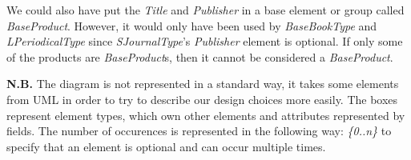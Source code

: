 We could also have put the \emph{Title} and \emph{Publisher} in a base element
or group called \emph{BaseProduct}. However, it would only have been used by
\emph{BaseBookType} and \emph{LPeriodicalType} since \emph{SJournalType}'s
\emph{Publisher} element is optional. If only some of the products are
\emph{BaseProduct}s, then it cannot be considered a \emph{BaseProduct}.

\begin{framehint}
\textbf{N.B.} The diagram is not represented in a standard way, it takes some
elements from UML in order to try to describe our design choices more easily.
The boxes represent element types, which own other elements and attributes
represented by fields. The number of occurences is represented in the following
way: \emph{\{0..n\}} to specify that an element is optional and can occur multiple
times.
\end{framehint}

\newpage





